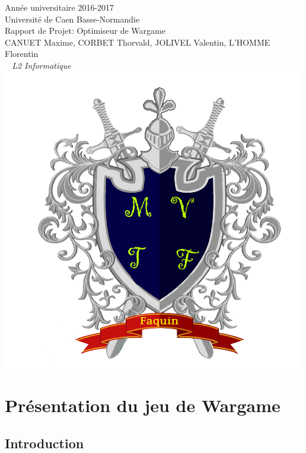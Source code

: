 \documentclass{article}
\begin{document}
\begin{titlepage}
	\begin{center}
		\Large{Année universitaire 2016-2017}\\
		\Large{Université de Caen Basse-Normandie}\\[1cm]		
		\huge Rapport de Projet: Optimiseur de Wargame\\[0.5cm]
		\vspace{1cm}
		CANUET Maxime, CORBET Thorvald, JOLIVEL Valentin, L'HOMME Florentin\\
		\normalsize{\textit{ ~ L2 Informatique}}\\
		\vspace{2cm}
		\includegraphics[scale=2.1]{../images/TRY1.png}
	\end{center}
\end{titlepage} 

\clearpage

\tableofcontents

\clearpage

\section{Présentation du jeu de Wargame}
 \subsection{Introduction}
\end{document}
